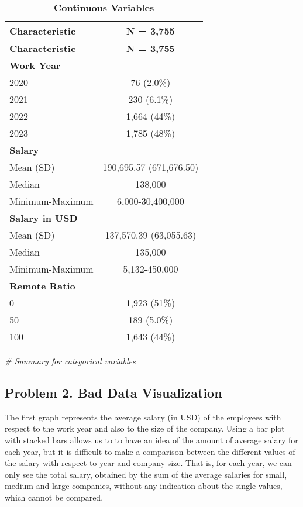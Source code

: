 \documentclass[
]{article}
\newenvironment{Shaded}{\begin{snugshade}}{\end{snugshade}}
\newcommand{\CommentTok}[1]{\textcolor[rgb]{0.56,0.35,0.01}{\textit{#1}}}
\begin{document}
\begin{longtable}[]{@{}lc@{}}
\caption{\textbf{Continuous Variables}}\tabularnewline
\toprule\noalign{}
\textbf{Characteristic} & \textbf{N = 3,755} \\
\midrule\noalign{}
\endfirsthead
\toprule\noalign{}
\textbf{Characteristic} & \textbf{N = 3,755} \\
\midrule\noalign{}
\endhead
\bottomrule\noalign{}
\endlastfoot
\textbf{Work Year} & \\
2020 & 76 (2.0\%) \\
2021 & 230 (6.1\%) \\
2022 & 1,664 (44\%) \\
2023 & 1,785 (48\%) \\
\textbf{Salary} & \\
Mean (SD) & 190,695.57 (671,676.50) \\
Median & 138,000 \\
Minimum-Maximum & 6,000-30,400,000 \\
\textbf{Salary in USD} & \\
Mean (SD) & 137,570.39 (63,055.63) \\
Median & 135,000 \\
Minimum-Maximum & 5,132-450,000 \\
\textbf{Remote Ratio} & \\
0 & 1,923 (51\%) \\
50 & 189 (5.0\%) \\
100 & 1,643 (44\%) \\
\end{longtable}

\begin{Shaded}
\begin{Highlighting}[]
\CommentTok{\# Summary for categorical variables}
\end{Highlighting}
\end{Shaded}

\hypertarget{problem-2.-bad-data-visualization}{%
\subsection{Problem 2. Bad Data
Visualization}\label{problem-2.-bad-data-visualization}}

The first graph represents the average salary (in USD) of the employees
with respect to the work year and also to the size of the company. Using
a bar plot with stacked bars allows us to to have an idea of the amount
of average salary for each year, but it is difficult to make a
comparison between the different values of the salary with respect to
year and company size. That is, for each year, we can only see the total
salary, obtained by the sum of the average salaries for small, medium
and large companies, without any indication about the single values,
which cannot be compared. \newline
\end{document}
